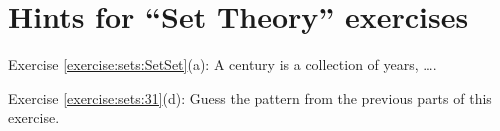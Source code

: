 \section{Hints for ``Set Theory'' exercises}\label{sec:set_chapter:hints}

\noindent Exercise \ref{exercise:sets:SetSet}(a): A century is a collection of years, \ldots.

\noindent Exercise \ref{exercise:sets:31}(d): Guess the pattern from the previous parts of this exercise.
